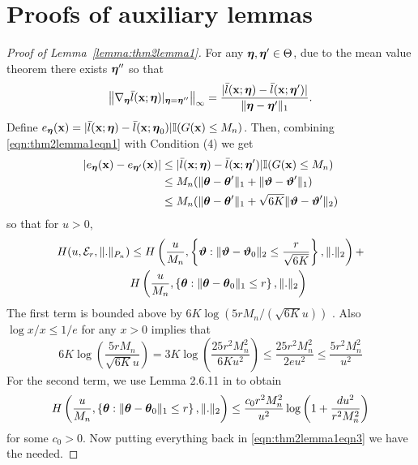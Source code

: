 \documentclass[11pt,letterpaper]{article}
\numberwithin{equation}{section}
\begin{document}
\section{Proofs of auxiliary lemmas}

\begin{proof}[Proof of Lemma~\ref{lemma:thm2lemma1}]
For any ${\boldsymbol{\eta}}, {\boldsymbol{\eta}}' \in \Theta$, due to the mean value theorem there exists ${\boldsymbol{\eta}}''$ so that
%
\begin{align}\label{eqn:thm2lemma1eqn1}
\left\| \nabla_{\boldsymbol{\eta}} \bar l({\bf{x}}; {\boldsymbol{\eta}})|_{{\boldsymbol{\eta}} = {\boldsymbol{\eta}}''} \right\|_\infty =
\frac{| \bar l({\bf{x}}; {\boldsymbol{\eta}}) -  \bar l({\bf{x}}; {\boldsymbol{\eta}}')|}{\| {\boldsymbol{\eta}} - {\boldsymbol{\eta}}'\|_1}.
\end{align}
%
Define $e_{\boldsymbol{\eta}}({\bf{x}}) = | \bar l({\bf{x}}; {\boldsymbol{\eta}}) -  \bar l({\bf{x}}; {\boldsymbol{\eta}}_0)| {\mathbb{I}}(G({\bf{x}}) \leq M_n)$. Then, combining \eqref{eqn:thm2lemma1eqn1} with Condition (4) we get
%
\begin{align}
| e_{\boldsymbol{\eta}} ({\bf{x}}) - e_{{\boldsymbol{\eta}}'} ({\bf{x}}) | & \leq | \bar l({\bf{x}}; {\boldsymbol{\eta}}) -  \bar l({\bf{x}}; {\boldsymbol{\eta}}')| {\mathbb{I}}(G({\bf{x}}) \leq M_n) \notag\\
& \leq M_n( \| {\boldsymbol{\theta}} - {\boldsymbol{\theta}}'\|_1 + \| {\boldsymbol{\vartheta}} - {\boldsymbol{\vartheta}}' \|_1) \notag\\
& \leq M_n( \| {\boldsymbol{\theta}} - {\boldsymbol{\theta}}'\|_1 + \sqrt{6K} \| {\boldsymbol{\vartheta}} - {\boldsymbol{\vartheta}}' \|_2) \label{eqn:thm2lemma1eqn2}
\end{align}
%
so that for $u > 0$,
%
\begin{align}\label{eqn:thm2lemma1eqn3}
H(u, {\cal{E}}_r, \|.\|_{P_n}) & \leq
H\left( \frac{u}{M_n}, \left\{ {\boldsymbol{\vartheta}}: \| {\boldsymbol{\vartheta}} - {\boldsymbol{\vartheta}}_0 \|_2 \leq \frac{r}{\sqrt{6K}} \right\}, \|.\|_2 \right) + \notag\\
& H\left( \frac{u}{M_n}, \left\{{\boldsymbol{\theta}}: \| {\boldsymbol{\theta}} - {\boldsymbol{\theta}}_0 \|_1 \leq r \right\} , \|.\|_2 \right) 
\end{align}
%
The first term is bounded above by $6K \log(5r M_n/(\sqrt{6K}u))$ \citep{StadlerEtal10}. Also $\log x/x \leq 1/e$ for any $x > 0$ implies that
%
$$
6K \log \left( \frac{5 r M_n}{\sqrt{6K} u} \right) = 3K \log \left( \frac{25 r^2 M_n^2}{6K u^2} \right) \leq
\frac{25 r^2 M_n^2}{2e u^2} \leq \frac{5 r^2 M_n^2}{u^2}
$$
%
For the second term, we use Lemma 2.6.11 in \cite{vdvWellnerBook96} to obtain
%
$$
H\left( \frac{u}{M_n}, \left\{{\boldsymbol{\theta}}: \| {\boldsymbol{\theta}} - {\boldsymbol{\theta}}_0 \|_1 \leq r \right\} , \|.\|_2 \right) \leq
\frac{ c_0 r^2 M_n^2}{u^2} \log \left(1 + \frac{d u^2}{r^2 M_n^2} \right)
$$
%
for some $c_0 > 0$. Now putting everything back in \eqref{eqn:thm2lemma1eqn3} we have the needed.
\end{proof}
\end{document}
